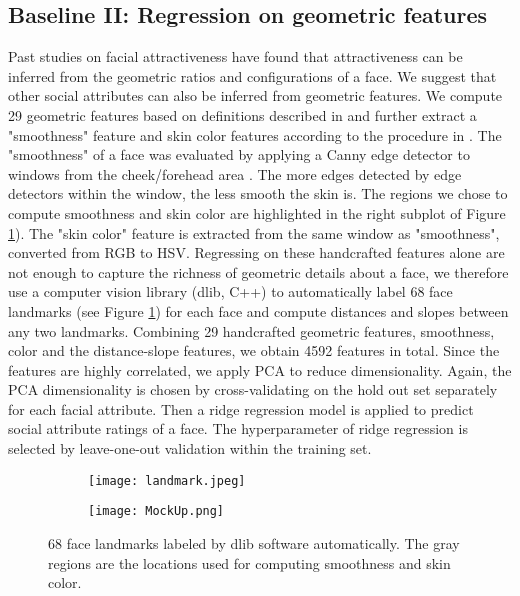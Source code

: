 \documentclass[10pt,twocolumn,letterpaper]{article}
\begin{document}
\subsection{Baseline II: Regression on geometric features}
Past studies on facial attractiveness have found that attractiveness can be inferred from the geometric ratios and configurations of a face\cite{eisenthal2006facial, kagian2008machine}. We suggest that other social attributes can also be inferred from geometric features. We compute 29 geometric features based on definitions described in \cite{ma2015chicago} and further extract a "smoothness" feature and skin color features according to the procedure in \cite{eisenthal2006facial, kagian2008machine}. The "smoothness" of a face was evaluated by applying a Canny edge detector to windows from the cheek/forehead area \cite{eisenthal2006facial}. The more edges detected by edge detectors within the window, the less smooth the skin is. The regions we chose to compute smoothness and skin color are highlighted in the right subplot of Figure \ref{faceLandmarks}). The "skin color" feature is extracted from the same window as "smoothness", converted from RGB to HSV. Regressing on these handcrafted features alone are not enough to capture the richness of geometric details about a face, we therefore use a computer vision library (dlib, C++) to automatically label 68 face landmarks (see Figure \ref{faceLandmarks}) for each face and compute distances and slopes between any two landmarks. Combining 29 handcrafted geometric features, smoothness, color and the distance-slope features, we obtain 4592 features in total. Since the features are highly correlated, we apply PCA to reduce dimensionality. Again, the PCA dimensionality is chosen by cross-validating on the hold out set separately for each facial attribute. Then a ridge regression model is applied to predict social attribute ratings of a face. The hyperparameter of ridge regression is selected by leave-one-out validation within the training set. 
\begin{figure}[!htbp]
\centering
\begin{subfigure}{.25\textwidth}
  \centering
  \texttt{[image: landmark.jpeg]}
\end{subfigure}%
\begin{subfigure}{.25\textwidth}
  \centering
  \texttt{[image: MockUp.png]}
\end{subfigure}
\caption{68 face landmarks labeled by dlib software automatically. The gray regions are the locations used for computing smoothness and skin color.}
\label{faceLandmarks}
\end{figure}
\end{document}
